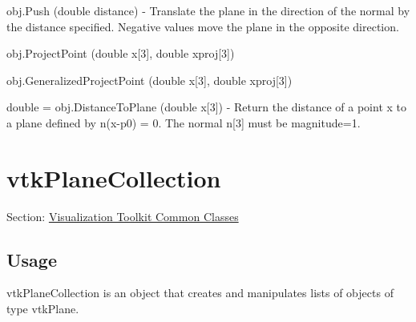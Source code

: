 \begin{DoxyItemize}
\item {\ttfamily obj.\-Push (double distance)} -\/ Translate the plane in the direction of the normal by the distance specified. Negative values move the plane in the opposite direction.  
\item {\ttfamily obj.\-Project\-Point (double x\mbox{[}3\mbox{]}, double xproj\mbox{[}3\mbox{]})}  
\item {\ttfamily obj.\-Generalized\-Project\-Point (double x\mbox{[}3\mbox{]}, double xproj\mbox{[}3\mbox{]})}  
\item {\ttfamily double = obj.\-Distance\-To\-Plane (double x\mbox{[}3\mbox{]})} -\/ Return the distance of a point x to a plane defined by n(x-\/p0) = 0. The normal n\mbox{[}3\mbox{]} must be magnitude=1.  
\end{DoxyItemize}\hypertarget{vtkcommon_vtkplanecollection}{}\section{vtk\-Plane\-Collection}\label{vtkcommon_vtkplanecollection}
Section\-: \hyperlink{sec_vtkcommon}{Visualization Toolkit Common Classes} \hypertarget{vtkwidgets_vtkxyplotwidget_Usage}{}\subsection{Usage}\label{vtkwidgets_vtkxyplotwidget_Usage}
vtk\-Plane\-Collection is an object that creates and manipulates lists of objects of type vtk\-Plane.

